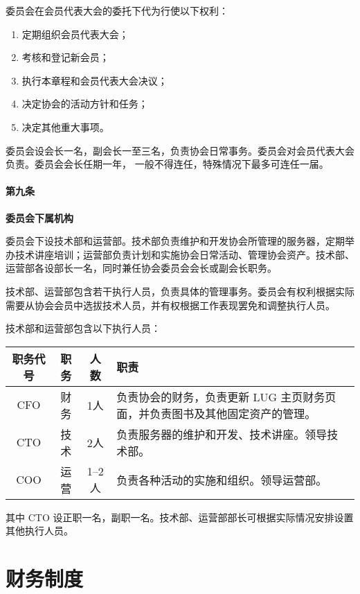 \documentclass[a4paper, 12pt, twoside]{ctexart}
\begin{document}
	委员会在会员代表大会的委托下代为行使以下权利：
	
	\begin{enumerate}
		\item 定期组织会员代表大会；
		\item 考核和登记新会员；
		\item 执行本章程和会员代表大会决议；
		\item 决定协会的活动方针和任务；
		\item 决定其他重大事项。
	\end{enumerate}
	
	委员会设会长一名，副会长一至三名，负责协会日常事务。委员会对会员代表大会负责。委员会会长任期一年， 一般不得连任，特殊情况下最多可连任一届。
	
	\paragraph{第九条} \textbf{委员会下属机构}
	
	委员会下设技术部和运营部。技术部负责维护和开发协会所管理的服务器，定期举办技术讲座培训；运营部负责计划和实施协会日常活动、管理协会资产。技术部、运营部各设部长一名，同时兼任协会委员会会长或副会长职务。
	
	技术部、运营部包含若干执行人员，负责具体的管理事务。委员会有权利根据实际需要从协会会员中选拔技术人员，并有权根据工作表现罢免和调整执行人员。
	
	技术部和运营部包含以下执行人员：
	
	\begin{table}[H]
		\centering
		\begin{tabularx}{\textwidth}{cccX}
			\toprule
			职务代号 & 职务 & 人数 & 职责 \\
			\midrule
			CFO & 财务 & 1人 & 负责协会的财务，负责更新 LUG 主页财务页面，并负责图书及其他固定资产的管理。 \\
			CTO & 技术 & 2人 & 负责服务器的维护和开发、技术讲座。领导技术部。 \\
			COO & 运营 & 1--2人 & 负责各种活动的实施和组织。领导运营部。\\
			\bottomrule
		\end{tabularx}
	\end{table}
	
	其中 CTO 设正职一名，副职一名。技术部、运营部部长可根据实际情况安排设置其他执行人员。
	
	\section{财务制度}
	
\end{document}
